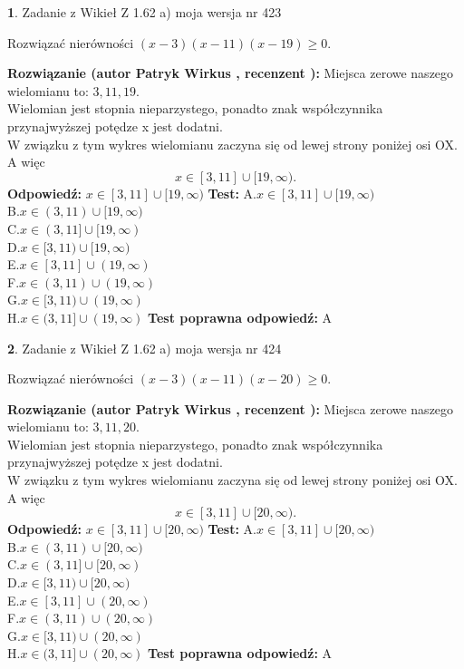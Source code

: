 \documentclass[12pt, a4paper]{article}
\theoremstyle{definition} %
\newtheorem{zad}{}
\newcommand{\zadStart}[1]{\begin{zad}#1\newline}
\newcommand{\zadStop}{\end{zad}}
\newcommand{\rozwStart}[2]{\noindent \textbf{Rozwiązanie (autor #1 , recenzent #2): }\newline}
\newcommand{\rozwStop}{\newline}
\newcommand{\odpStart}{\noindent \textbf{Odpowiedź:}\newline}
\newcommand{\odpStop}{\newline}
\newcommand{\testStart}{\noindent \textbf{Test:}\newline}
\newcommand{\testStop}{\newline}
\newcommand{\kluczStart}{\noindent \textbf{Test poprawna odpowiedź:}\newline}
\newcommand{\kluczStop}{\newline}
\begin{document}
\zadStart{Zadanie z Wikieł Z 1.62 a) moja wersja nr 423}

Rozwiązać nierówności $(x-3)(x-11)(x-19)\ge0$.
\zadStop
\rozwStart{Patryk Wirkus}{}
Miejsca zerowe naszego wielomianu to: $3, 11, 19$.\\
Wielomian jest stopnia nieparzystego, ponadto znak współczynnika przy\linebreak najwyższej potędze x jest dodatni.\\ W związku z tym wykres wielomianu zaczyna się od lewej strony poniżej osi OX. A więc $$x \in [3,11] \cup [19,\infty).$$
\rozwStop
\odpStart
$x \in [3,11] \cup [19,\infty)$
\odpStop
\testStart
A.$x \in [3,11] \cup [19,\infty)$\\
B.$x \in (3,11) \cup [19,\infty)$\\
C.$x \in (3,11] \cup [19,\infty)$\\
D.$x \in [3,11) \cup [19,\infty)$\\
E.$x \in [3,11] \cup (19,\infty)$\\
F.$x \in (3,11) \cup (19,\infty)$\\
G.$x \in [3,11) \cup (19,\infty)$\\
H.$x \in (3,11] \cup (19,\infty)$
\testStop
\kluczStart
A
\kluczStop



\zadStart{Zadanie z Wikieł Z 1.62 a) moja wersja nr 424}

Rozwiązać nierówności $(x-3)(x-11)(x-20)\ge0$.
\zadStop
\rozwStart{Patryk Wirkus}{}
Miejsca zerowe naszego wielomianu to: $3, 11, 20$.\\
Wielomian jest stopnia nieparzystego, ponadto znak współczynnika przy\linebreak najwyższej potędze x jest dodatni.\\ W związku z tym wykres wielomianu zaczyna się od lewej strony poniżej osi OX. A więc $$x \in [3,11] \cup [20,\infty).$$
\rozwStop
\odpStart
$x \in [3,11] \cup [20,\infty)$
\odpStop
\testStart
A.$x \in [3,11] \cup [20,\infty)$\\
B.$x \in (3,11) \cup [20,\infty)$\\
C.$x \in (3,11] \cup [20,\infty)$\\
D.$x \in [3,11) \cup [20,\infty)$\\
E.$x \in [3,11] \cup (20,\infty)$\\
F.$x \in (3,11) \cup (20,\infty)$\\
G.$x \in [3,11) \cup (20,\infty)$\\
H.$x \in (3,11] \cup (20,\infty)$
\testStop
\kluczStart
A
\kluczStop
\end{document}
